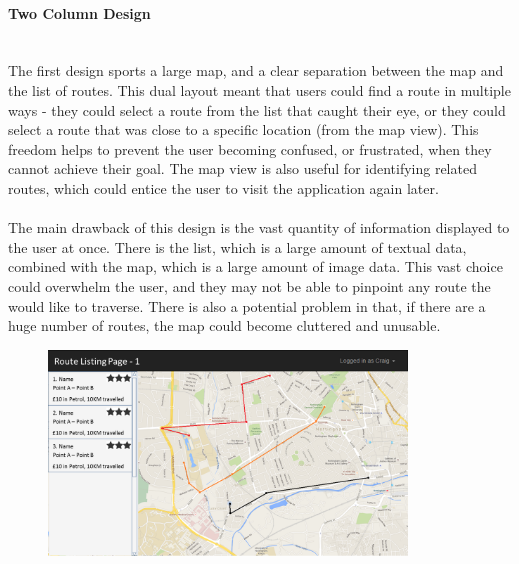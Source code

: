 \paragraph{Two Column Design}\ \\
The first design sports a large map, and a clear separation between the map and the list of routes. This dual layout meant that users could find a route in multiple ways - they could select a route from the list that caught their eye, or they could select a route that was close to a specific location (from the map view). This freedom helps to prevent the user becoming confused, or frustrated, when they cannot achieve their goal. The map view is also useful for identifying related routes, which could entice the user to visit the application again later.\ \\
\ \\
The main drawback of this design is the vast quantity of information displayed to the user at once. There is the list, which is a large amount of textual data, combined with the map, which is a large amount of image data. This vast choice could overwhelm the user, and they may not be able to pinpoint any route the would like to traverse. There is also a potential problem in that, if there are a huge number of routes, the map could become cluttered and unusable.
\begin{figure}[!ht]
\vspace{6mm}
	\begin{center}
		\includegraphics[width=0.85\textwidth]{images/ui-rlp-1.png}
	\end{center}
	\vspace{-6mm}
\end{figure}

\newpage 

